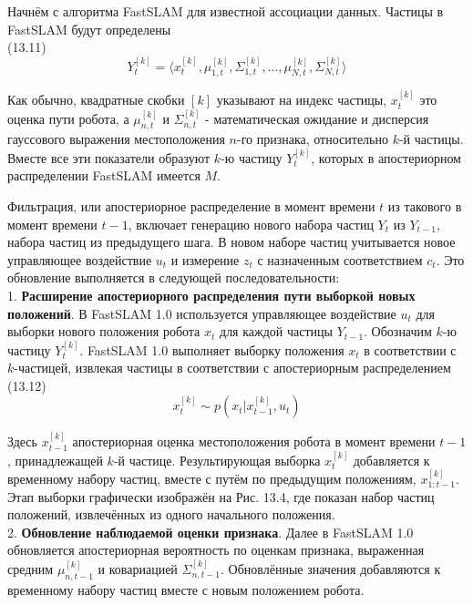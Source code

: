 \documentclass[10pt,a4paper]{article}
\begin{document}
Начнём с алгоритма FastSLAM для известной ассоциации данных. Частицы в FastSLAM будут определены\\

(13.11)
$$Y_t^{[k]}=\langle x_t^{[k]},\mu_{1,t}^{[k]},\varSigma_{1,t}^{[k]},...,\mu_{N,t}^{[k]},\varSigma_{N,t}^{[k]}\rangle$$

Как обычно, квадратные скобки $[k]$ указывают на индекс частицы, $x_t^{[k]}$ это оценка пути робота, а $\mu_{n,t}^{[k]}$ и $\varSigma_{n,t}^{[k]}$ - математическая ожидание и дисперсия гауссового выражения местоположения $n$-го признака, относительно $k$-й частицы. Вместе все эти показатели образуют $k$-ю частицу $Y_t^{[k]}$, которых в апостериорном распределении FastSLAM имеется $M$.

Фильтрация, или апостериорное распределение в момент времени $t$ из такового в момент времени $t-1$, включает генерацию нового набора частиц $Y_t$ из $Y_{t-1}$, набора частиц из предыдущего шага.  В новом наборе частиц учитывается новое управляющее воздействие $u_t$ и измерение $z_t$ с назначенным соответствием $c_t$. Это обновление выполняется в следующей последовательности:\\

1. \textbf{Расширение апостериорного распределения пути выборкой новых положений}. В FastSLAM 1.0 используется управляющее воздействие $u_t$ для выборки нового положения робота $x_t$ для каждой частицы $Y_{t-1}$. Обозначим $k$-ю частицу $Y_t^{[k]}$. FastSLAM 1.0 выполняет выборку положения $x_t$ в соответствии с $k$-частицей, извлекая частицы в соответствии с апостериорным распределением\\

(13.12)
$$x_t^{[k]}\sim p(x_t|x_{t-1}^{[k]},u_t)$$

Здесь $x_{t-1}^{[k]}$ апостериорная оценка местоположения робота в момент времени $t-1$, принадлежащей $k$-й частице.  Результирующая выборка $x_t^{[k]}$ добавляется к временному набору частиц, вместе с путём по предыдущим положениям, $x_{1:t-1}^{[k]}$.
Этап выборки графически изображён на Рис. 13.4, где показан набор частиц положений, извлечённых из одного начального положения.\\

2.\textbf{	Обновление наблюдаемой оценки признака}. Далее в FastSLAM 1.0 обновляется апостериорная вероятность по оценкам признака, выраженная средним $\mu_{n,t-1}^{[k]}$
и ковариацией $\varSigma_{n,t-1}^{[k]}$. Обновлённые значения добавляются к временному набору частиц вместе с новым положением робота.
\end{document}
